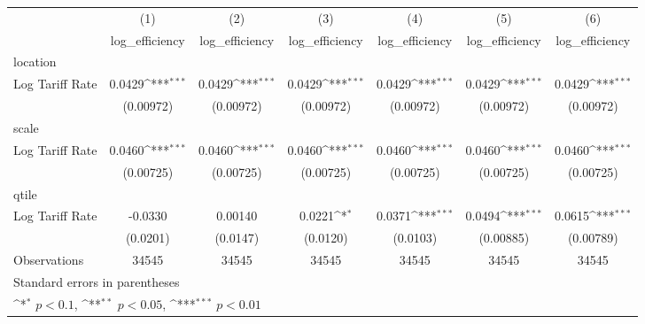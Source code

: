 {
\def\sym#1{\ifmmode^{#1}\else\(^{#1}\)\fi}
\begin{tabular}{l*{6}{c}}
\hline\hline
                    &\multicolumn{1}{c}{(1)}&\multicolumn{1}{c}{(2)}&\multicolumn{1}{c}{(3)}&\multicolumn{1}{c}{(4)}&\multicolumn{1}{c}{(5)}&\multicolumn{1}{c}{(6)}\\
                    &\multicolumn{1}{c}{log\_efficiency}&\multicolumn{1}{c}{log\_efficiency}&\multicolumn{1}{c}{log\_efficiency}&\multicolumn{1}{c}{log\_efficiency}&\multicolumn{1}{c}{log\_efficiency}&\multicolumn{1}{c}{log\_efficiency}\\
\hline
location            &                     &                     &                     &                     &                     &                     \\
Log Tariff Rate     &      0.0429\sym{***}&      0.0429\sym{***}&      0.0429\sym{***}&      0.0429\sym{***}&      0.0429\sym{***}&      0.0429\sym{***}\\
                    &   (0.00972)         &   (0.00972)         &   (0.00972)         &   (0.00972)         &   (0.00972)         &   (0.00972)         \\
\hline
scale               &                     &                     &                     &                     &                     &                     \\
Log Tariff Rate     &      0.0460\sym{***}&      0.0460\sym{***}&      0.0460\sym{***}&      0.0460\sym{***}&      0.0460\sym{***}&      0.0460\sym{***}\\
                    &   (0.00725)         &   (0.00725)         &   (0.00725)         &   (0.00725)         &   (0.00725)         &   (0.00725)         \\
\hline
qtile               &                     &                     &                     &                     &                     &                     \\
Log Tariff Rate     &     -0.0330         &     0.00140         &      0.0221\sym{*}  &      0.0371\sym{***}&      0.0494\sym{***}&      0.0615\sym{***}\\
                    &    (0.0201)         &    (0.0147)         &    (0.0120)         &    (0.0103)         &   (0.00885)         &   (0.00789)         \\
\hline
Observations        &       34545         &       34545         &       34545         &       34545         &       34545         &       34545         \\
\hline\hline
\multicolumn{7}{l}{\footnotesize Standard errors in parentheses}\\
\multicolumn{7}{l}{\footnotesize \sym{*} \(p<0.1\), \sym{**} \(p<0.05\), \sym{***} \(p<0.01\)}\\
\end{tabular}
}
